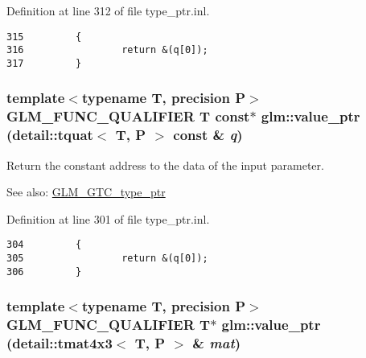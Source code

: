 Definition at line 312 of file type\_\-ptr.inl.

\begin{Code}\begin{verbatim}315         {
316                 return &(q[0]);
317         }
\end{verbatim}
\end{Code}


\hypertarget{group__gtc__type__ptr_g06ca6cd0663b5a1ed1c217efc80013d8}{
\subsubsection[value\_\-ptr]{\setlength{\rightskip}{0pt plus 5cm}template$<$typename T, precision P$>$ GLM\_\-FUNC\_\-QUALIFIER T const$\ast$ glm::value\_\-ptr (detail::tquat$<$ T, P $>$ const \& {\em q})}}
\label{group__gtc__type__ptr_g06ca6cd0663b5a1ed1c217efc80013d8}


Return the constant address to the data of the input parameter. \begin{Desc}
\item[See also:]\hyperlink{group__gtc__type__ptr}{GLM\_\-GTC\_\-type\_\-ptr} \end{Desc}


Definition at line 301 of file type\_\-ptr.inl.

\begin{Code}\begin{verbatim}304         {
305                 return &(q[0]);
306         }
\end{verbatim}
\end{Code}


\hypertarget{group__gtc__type__ptr_g1ba54cb6c4ff3c61c27f4883bddf6d31}{
\subsubsection[value\_\-ptr]{\setlength{\rightskip}{0pt plus 5cm}template$<$typename T, precision P$>$ GLM\_\-FUNC\_\-QUALIFIER T$\ast$ glm::value\_\-ptr (detail::tmat4x3$<$ T, P $>$ \& {\em mat})}}
\label{group__gtc__type__ptr_g1ba54cb6c4ff3c61c27f4883bddf6d31}


